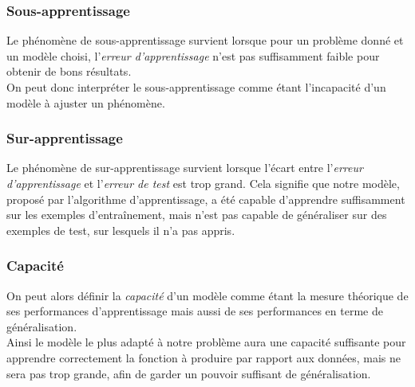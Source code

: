 \documentclass[10pt,a4paper]{report}
\begin{document}
			\subsubsection{Sous-apprentissage}
			Le phénomène de sous-apprentissage survient lorsque pour un problème donné et un modèle choisi, l'\emph{erreur d'apprentissage} n'est pas suffisamment faible pour obtenir de bons résultats.\\
		On peut donc interpréter le sous-apprentissage comme étant l'incapacité d'un modèle à ajuster un phénomène.\\
			\subsubsection{Sur-apprentissage}
			Le phénomène de sur-apprentissage survient lorsque l'écart entre l'\emph{erreur d'apprentissage} et l'\emph{erreur de test} est trop grand. Cela signifie que notre modèle, proposé par l'algorithme d'apprentissage, a été capable d'apprendre suffisamment sur les exemples d'entraînement, mais n'est pas capable de généraliser sur des exemples de test, sur lesquels il n'a pas appris.
			\subsubsection{Capacité}
			On peut alors définir la \emph{capacité} d'un modèle comme étant la mesure théorique de ses performances d'apprentissage mais aussi de ses performances en terme de généralisation.\\
		Ainsi le modèle le plus adapté à notre problème aura une capacité suffisante pour apprendre correctement la fonction à produire par rapport aux données, mais ne sera pas trop grande, afin de garder un pouvoir suffisant de généralisation.
			
\end{document}
